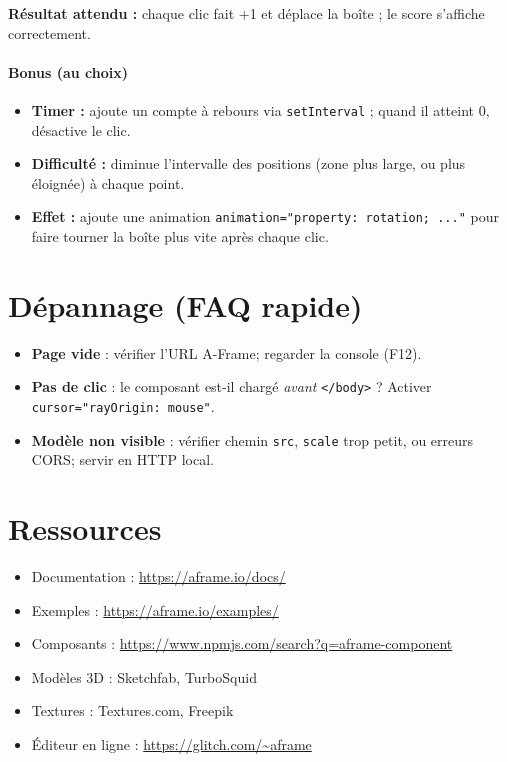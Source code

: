 \documentclass[12pt]{article}
\begin{document}
\begin{checkpoint}
\textbf{Résultat attendu :} chaque clic fait +1 et déplace la boîte ; le score s’affiche correctement.
\end{checkpoint}

\paragraph{Bonus (au choix)}
\begin{itemize}
  \item \textbf{Timer :} ajoute un compte à rebours via \texttt{setInterval} ; quand il atteint 0, désactive le clic.
  \item \textbf{Difficulté :} diminue l’intervalle des positions (zone plus large, ou plus éloignée) à chaque point.
  \item \textbf{Effet :} ajoute une animation \texttt{animation="property: rotation; ..."} pour faire tourner la boîte plus vite après chaque clic.
\end{itemize}


\section{Dépannage (FAQ rapide)}
\begin{itemize}
  \item \textbf{Page vide} : vérifier l'URL A-Frame; regarder la console (F12).
  \item \textbf{Pas de clic} : le composant est-il chargé \emph{avant} \texttt{</body>} ? Activer \texttt{cursor="rayOrigin: mouse"}.
  \item \textbf{Modèle non visible} : vérifier chemin \texttt{src}, \texttt{scale} trop petit, ou erreurs CORS; servir en HTTP local.
\end{itemize}

\section{Ressources}
\begin{itemize}
    \item Documentation : \url{https://aframe.io/docs/}
    \item Exemples : \url{https://aframe.io/examples/}
    \item Composants : \url{https://www.npmjs.com/search?q=aframe-component}
    \item Modèles 3D : Sketchfab, TurboSquid
    \item Textures : Textures.com, Freepik
    \item Éditeur en ligne : \url{https://glitch.com/~aframe}
\end{itemize}
\end{document}
